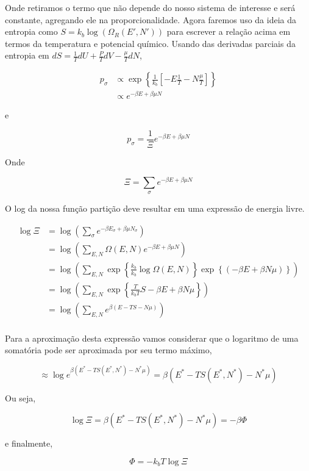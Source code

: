 Onde retiramos o termo que não depende do nosso sistema de interesse e será constante, agregando ele na proporcionalidade. Agora faremos uso da ideia da entropia como $S = k_b \log{(\Omega_R(E',N'))}$ para escrever a relação acima em termos da temperatura e potencial químico. Usando das derivadas parciais da entropia em $dS = \frac{1}{T} dU + \frac{P}{T} dV - \frac{\mu}{T} dN$,

\begin{align*}
	p_{\sigma} & \propto \exp{\left\lbrace  \frac{1}{k_b} \left[  -E \frac{1}{T} - N \frac{\mu}{T} \right]  \right\rbrace} \\
	& \propto e^{-\beta E + \beta \mu N}
\end{align*}

e

\begin{equation}
	p_\sigma = \frac{1}{\Xi} e^{-\beta E + \beta \mu N}
\end{equation}

Onde 

\begin{equation}
	\Xi = \sum_\sigma e^{-\beta E + \beta \mu N}
\end{equation}

O log da nossa função partição deve resultar em uma expressão de energia livre.

\begin{align*}
	\log{\Xi} & = \log{ \left( \sum_\sigma e^{-\beta E_\sigma + \beta \mu N_\sigma} \right) } \\
	& = \log{ \left( \sum_{E,N}  \Omega(E,N) e^{-\beta E + \beta \mu N} \right) } \\
	& = \log{ \left( \sum_{E,N}  \exp{\left\lbrace \frac{k_b}{k_b} \log{\Omega(E,N)}\right\rbrace}  \exp{\left\lbrace (-\beta E + \beta N \mu) \right\rbrace} \right) } \\
	& = \log{ \left( \sum_{E,N}  \exp{\left\lbrace \frac{T}{k_b T} S - \beta E + \beta N \mu \right\rbrace} \right) } \\
	& = \log{ \left( \sum_{E,N}  e^{ \beta(E - TS - N \mu)} \right) } \\
\end{align*}

Para a aproximação desta expressão vamos considerar que o logaritmo de uma somatória pode ser aproximada por seu termo máximo,

\[
	\approx \log{ e^{ \beta(E^* - TS(E^*,N^*) - N^* \mu)}} = \beta(E^* - TS(E^*,N^*) - N^* \mu)
\]

Ou seja,

\[
\log{\Xi} = \beta(E^* - TS(E^*,N^*) - N^* \mu) = -\beta \Phi
\]

e finalmente,

\begin{equation}
	\Phi = -k_b T \log{\Xi}
\end{equation}